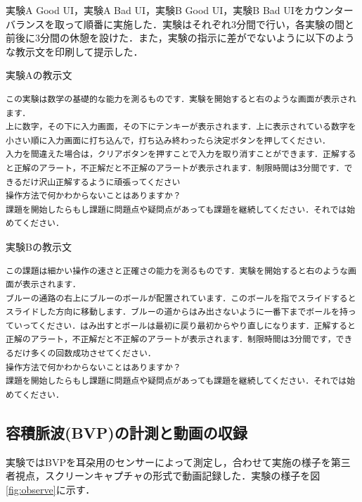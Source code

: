 実験A Good UI，実験A Bad UI，実験B Good UI，実験B Bad UIをカウンターバランスを取って順番に実施した．実験はそれぞれ3分間で行い，各実験の間と前後に3分間の休憩を設けた．また，実験の指示に差がでないように以下のような教示文を印刷して提示した．

\begin{itembox}[l]{実験Aの教示文}
\begin{verbatim}
この実験は数学の基礎的な能力を測るものです．実験を開始すると右のような画面が表示されます．
上に数字，その下に入力画面，その下にテンキーが表示されます．上に表示されている数字を小さい順に入力画面に打ち込んで，打ち込み終わったら決定ボタンを押してください．
入力を間違えた場合は，クリアボタンを押すことで入力を取り消すことができます．正解すると正解のアラート，不正解だと不正解のアラートが表示されます．制限時間は3分間です．できるだけ沢山正解するように頑張ってください
操作方法で何かわからないことはありますか？
課題を開始したらもし課題に問題点や疑問点があっても課題を継続してください．それでは始めてください．
\end{verbatim}
\end{itembox}

\begin{itembox}[l]{実験Bの教示文}
\begin{verbatim}
この課題は細かい操作の速さと正確さの能力を測るものです．実験を開始すると右のような画面が表示されます．
ブルーの通路の右上にブルーのボールが配置されています．このボールを指でスライドするとスライドした方向に移動します．ブルーの道からはみ出さないように一番下までボールを持っていってください．はみ出すとボールは最初に戻り最初からやり直しになります．正解すると正解のアラート，不正解だと不正解のアラートが表示されます．制限時間は3分間です，できるだけ多くの回数成功させてください．
操作方法で何かわからないことはありますか？
課題を開始したらもし課題に問題点や疑問点があっても課題を継続してください．それでは始めてください．
\end{verbatim}
\end{itembox}

\subsection{容積脈波(BVP)の計測と動画の収録}

実験ではBVPを耳朶用のセンサーによって測定し，合わせて実施の様子を第三者視点，スクリーンキャプチャの形式で動画記録した．実験の様子を図\ref{fig:observe}に示す．


